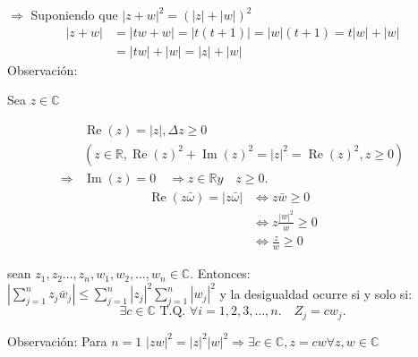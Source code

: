 $\Rightarrow$ Suponiendo que $|z+w|^2 = (|z|+|w|)^2$
 \[
   \begin{aligned}
     |z+w| & = |t w+w| = |t(t+1)| = |w|(t+1) = t|w|+|w| \\
         & = |t w|+|w| = |z|+|w|
   \end{aligned}
 \]
Observación: 

Sea $z \in \mathbb{C}$

\[
  \begin{aligned}
   & \operatorname{Re}(z)=|z|, \Delta z \geqslant 0 \\
   & \left(z \in \mathbb{R}, \operatorname{Re}(z)^{2}+\operatorname{Im}(z)^{2}=|z|^{2}=\operatorname{Re}(z)^{2}, z \geqslant 0\right) \\
   \Rightarrow & \operatorname{Im}(z)=0 \quad \Rightarrow z \in \mathbb{R} y \quad z \geqslant 0 .
  \end{aligned}
\]
\[
  \begin{aligned}
    \operatorname{Re}(z\bar{\omega})=|z \bar{\omega}|    & \Leftrightarrow z \bar{w} \geqslant 0 \\
    & \Leftrightarrow z\frac{|w|^{2}}{w} \geqslant 0 \\
    & \Leftrightarrow \frac{z}{w} \geqslant  0
  \end{aligned}
\]
\begin{theorem}
   sean $z_{1}, z_{2} \ldots, z_{n}, w_{1}, w_{2}, \ldots, w_{n} \in \mathbb{C}$.
   Entonces: $\left|\sum_{j=1}^{n} z_{j} \bar{w}_{j}\right| \leqslant \sum_{j=1}^{n}\left|z_{j}\right|^{2} \sum_{j=1}^{n}\left|w_{j}\right|^{2}$
   y la desigualdad ocurre si y solo si:
\[
\exists c \in \mathbb{C} \text { T.Q. } \forall i=1,2,3, \ldots, n . \quad Z_{j}=c w_{j} .
\]
\end{theorem}

Observación:
Para $n=1$ $|zw|^2 = |z|^2 |w|^2 \Rightarrow \exists c \in \mathbb{C}, z=cw \forall z, w \in \mathbb{C}$

